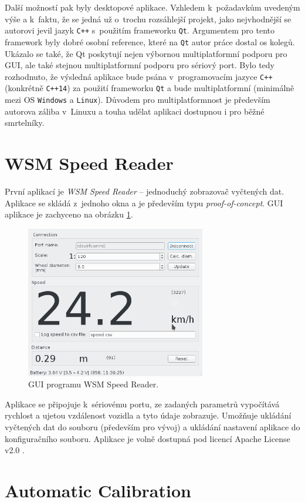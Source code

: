 Další možností pak byly desktopové aplikace. Vzhledem k~požadavkům uvedeným
výše a k~faktu, že se jedná už o~trochu rozsáhlejší projekt, jako nejvhodnější
se autorovi jevil jazyk \texttt{C++} s~použitím frameworku \texttt{Qt}.
Argumentem pro tento framework byly dobré osobní reference, které na
\texttt{Qt} autor práce dostal os kolegů. Ukázalo se také, že Qt poskytují
nejen výbornou multiplatformní podporu pro GUI, ale také stejnou
multiplatformní podporu pro sériový port. Bylo tedy rozhodnuto, že výsledná
aplikace bude psána v~programovacím jazyce \texttt{C++} (konkrétně
\texttt{C++14}) za použití frameworku \texttt{Qt} a bude multiplatformní
(minimálně mezi OS \texttt{Windows} a \texttt{Linux}). Důvodem pro
multiplatformnost je především autorova záliba v~Linuxu a touha udělat aplikaci
dostupnou i pro běžné smrtelníky.

\section{WSM Speed Reader}
\label{sec:sw-wsm-speed-reader}

První aplikací je \textit{WSM Speed Reader} -- jednoduchý zobrazovač vyčtených
dat. Aplikace se skládá z~jednoho okna a je především typu
\textit{proof-of-concept}. GUI aplikace je zachyceno na obrázku
\ref{fig:wsm-speed-reader-gui}.

\begin{figure}[h]
\includegraphics[width=0.7\textwidth]{data/speed_reader_screenshot.png}
\caption{GUI programu WSM Speed Reader.}
\label{fig:wsm-speed-reader-gui}
\end{figure}

Aplikace se připojuje k~sériovému portu, ze zadaných parametrů vypočítává
rychlost a ujetou vzdálenost vozidla a tyto údaje zobrazuje. Umožňuje ukládání
vyčtených dat do souboru (především pro vývoj) a ukládání nastavení aplikace
do konfiguračního souboru. Aplikace je volně dostupná pod licencí Apache
License v2.0 \cite{wsm-speed-reader}.

\section{Automatic Calibration}
\label{sec:sw-wsm-auto-calib}
